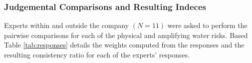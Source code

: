 \documentclass[a4paper]{article}
\begin{document}
%

\subsubsection{Judgemental Comparisons and Resulting Indeces}
Experts within and outside the company $(N=11)$ were asked to perform the pairwise comparisons for each of the physical and amplifying water risks. 
Based 
Table \ref{tab:responses} details the weights computed from the responses and the resulting consistency ratio for each of the experts' responses. 
\end{document}

